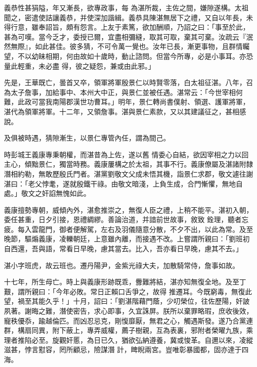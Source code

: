 \begin{pinyinscope}
 義恭性甚狷隘，年又漸長，欲專政事，每
 為湛所裁，主佐之間，嫌隙遂構。太祖聞之，密遣使詰讓義恭，并使深加諧緝。義恭具陳湛無居下之禮，又自以年長，未得行意，雖奉詔旨，頗有怨言。上友于素篤，欲加酬順，乃詔之曰：「事至於此，甚為可嘆。當今乏才，委授已爾，宜盡相彌縫，取其可取，棄其可棄。汝疏云『泯然無際』，如此甚佳。彼多猜，不可令萬一覺也。汝年已長，漸更事物，且群情矚望，不以幼昧相期，何由故如十歲時，動止諮問。但當今所專，必是小事耳。亦恐量此輕重，未必盡
 得，彼之疑怨，兼或由此邪。」



 先是，王華既亡，曇首又卒，領軍將軍殷景仁以時賢零落，白太祖征湛。八年，召為太子詹事，加給事中、本州大中正，與景仁並被任遇。湛常云：「今世宰相何難，此政可當我南陽郡漢世功曹耳。」明年，景仁轉尚書僕射、領選、護軍將軍，湛代為領軍將軍。十二年，又領詹事。湛與景仁素款，又以其建議征之，甚相感說。



 及俱被時遇，猜隙漸生，以景仁專管內任，謂為間己。



 時彭城王義康專秉朝權，而湛昔為上佐，遂以舊
 情委心自結，欲因宰相之力以回主心，傾黜景仁，獨當時務。義康屢構之於太祖，其事不行。義康僚屬及湛諸附隸潛相約勒，無敢歷殷氏門者。湛黨劉敬文父成未悟其機，詣景仁求郡，敬文遽往謝湛曰：「老父悖耄，遂就殷鐵干祿。由敬文暗淺，上負生成，合門慚懼，無地自處。」敬文之奸諂無愧如此。



 義康擅勢專朝，威傾內外，湛愈推崇之，無復人臣之禮，上稍不能平。湛初入朝，委任甚重，日夕引接，恩禮綢繆。善論治道，并諳前世故事，敘致
 銓理，聽者忘疲。每入雲龍門，御者便解駕，左右及羽儀隨意分散，不夕不出，以此為常。及至晚節，驅煽義康，凌轢朝廷，上意雖內離，而接遇不改。上嘗謂所親曰：「劉班初自西還，吾與語，常看日早晚，慮其當去。比入，吾亦看日早晚，慮其不去。」



 湛小字班虎，故云班也。遷丹陽尹，金紫光祿大夫，加散騎常侍，詹事如故。



 十七年，所生母亡。時上與義康形跡既乖，釁難將結，湛亦知無復全地。及至丁艱，謂所親曰：「今年必敗。常日正賴口舌爭之，故得
 推遷耳。今既窮毒，無復此望，禍至其能久乎！」十月，詔曰：「劉湛階藉門蔭，少叨榮位，往佐歷陽，奸詖夙著。謝晦之難，潛使密告，求心即事，久宜誅屏。朕所以棄罪略瑕，庶收後效，寵秩優忝，踰越倫匹。而凶忍忌克，剛愎靡厭，無君之心，觸遇斯發。遂乃合黨連群，構扇同異，附下蔽上，專弄威權，薦子樹親，互為表裏，邪附者榮曜九族，乘理者推陷必至。旋觀奸慝，為日已久，猶欲弘納遵養，冀或悛革。自邇以來，凌縱滋甚，悖言懟容，罔所顧忌，險謀潛
 計，睥睨兩宮。豈唯彰暴國都，固亦達于四海。




\end{pinyinscope}
